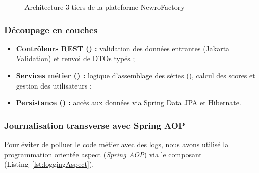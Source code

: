 \documentclass{tnreport}
\begin{document}
\begin{figure}[htbp]
\caption{Architecture 3-tiers de la plateforme NewroFactory}
\label{fig:architecture_globale_quiz}
\end{figure}

\subsubsection{Découpage en couches}
\begin{itemize}
    \item \textbf{Contrôleurs REST () :} validation des données entrantes (Jakarta Validation) et renvoi de DTOs typés ;
    \item \textbf{Services métier () :} logique d'assemblage des séries (), calcul des scores et gestion des utilisateurs ;
    \item \textbf{Persistance () :} accès aux données via Spring Data JPA et Hibernate.
\end{itemize}

\subsubsection{Journalisation transverse avec Spring AOP}
Pour éviter de polluer le code métier avec des logs, nous avons utilisé la programmation orientée aspect (\textit{Spring AOP}) via le composant  (Listing~\ref{lst:loggingAspect}).
\end{document}
